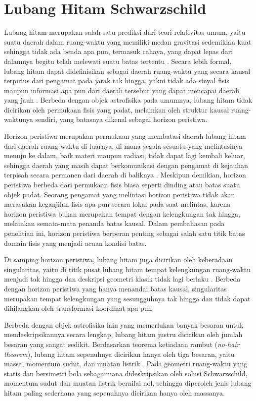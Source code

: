 \section{Lubang Hitam Schwarzschild}
\label{sec:lubang-hitam}

\noindent Lubang hitam merupakan salah satu prediksi dari teori relativitas 
umum, yaitu suatu daerah dalam ruang-waktu yang memiliki medan gravitasi sedemikian kuat 
sehingga tidak ada benda apa pun, termasuk cahaya, yang dapat lepas dari dalamnya begitu 
telah melewati suatu batas tertentu \parencite{Frolov1998}. Secara lebih formal, 
lubang hitam dapat didefinisikan sebagai daerah ruang-waktu yang secara kausal terputus 
dari pengamat pada jarak tak hingga, yakni tidak ada sinyal fisis maupun informasi apa 
pun dari daerah tersebut yang dapat mencapai daerah yang jauh \parencite{Chandrasekhar1983}. 
Berbeda dengan objek astrofisika pada umumnya, lubang hitam tidak dicirikan oleh permukaan fisis yang padat, melainkan oleh 
struktur kausal ruang-waktunya sendiri, yang batasnya dikenal sebagai horizon peristiwa.

Horizon peristiwa merupakan permukaan yang membatasi daerah lubang hitam dari daerah 
ruang-waktu di luarnya, di mana segala sesuatu yang melintasinya menuju ke dalam, baik 
materi maupun radiasi, tidak dapat lagi kembali keluar, sehingga daerah yang masih dapat 
berkomunikasi dengan pengamat di kejauhan terpisah secara permanen dari daerah di baliknya 
\parencite{Frolov1998, Wald1984}. Meskipun demikian, horizon peristiwa berbeda dari permukaan fisis biasa seperti dinding 
atau batas suatu objek padat. Seorang pengamat yang melintasi horizon peristiwa tidak akan 
merasakan keganjilan fisis apa pun secara lokal pada saat melintas, karena horizon 
peristiwa bukan merupakan tempat dengan kelengkungan tak hingga, melainkan semata-mata 
penanda batas kausal. Dalam pembahasan pada penelitian ini, horizon 
peristiwa berperan penting sebagai salah satu titik batas domain fisis yang menjadi acuan 
kondisi batas.

Di samping horizon peristiwa, lubang hitam juga dicirikan oleh keberadaan singularitas, 
yaitu di titik pusat lubang hitam tempat kelengkungan ruang-waktu menjadi tak hingga dan 
deskripsi geometri klasik tidak lagi berlaku \parencite{Frolov1998}. Berbeda dengan horizon 
peristiwa yang hanya menandai batas kausal, singularitas merupakan tempat kelengkungan 
yang sesungguhnya tak hingga dan tidak dapat dihilangkan oleh transformasi koordinat 
apa pun.

Berbeda dengan objek astrofisika lain yang memerlukan banyak besaran untuk 
mendeskripsikannya secara lengkap, lubang hitam justru dicirikan oleh jumlah besaran yang 
sangat sedikit. Berdasarkan teorema ketiadaan rambut (\textit{no-hair theorem}), lubang 
hitam sepenuhnya dicirikan hanya oleh tiga besaran, yaitu massa, momentum sudut, dan muatan 
listrik \parencite{Frolov1998, Ruffini1971}. Pada geometri ruang-waktu yang statis dan 
bersimetri bola sebagaimana dideskripsikan oleh solusi Schwarzschild, momentum sudut dan 
muatan listrik bernilai nol, sehingga diperoleh jenis lubang hitam paling sederhana yang 
sepenuhnya dicirikan hanya oleh massanya.


